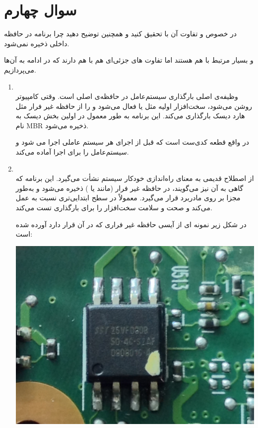 \section{سوال چهارم}

در خصوص  و تفاوت آن با  تحقیق کنید و همچنین توضیح دهید چرا برنامه  در حافظه داخلی ذخیره نمی‌شود.


\begin{qsolve}[]
	و
	بسیار مرتبط با هم هستند اما تفاوت های جزئی‌ای هم با هم دارند که در ادامه به آن‌ها می‌پردازیم.
	
	\begin{enumerate}
		\item 
		\\
		وظیفه‌ی اصلی  بارگذاری سیستم‌عامل در حافظه‌ی اصلی است. وقتی کامپیوتر روشن می‌شود، سخت‌افزار اولیه مثل  یا  فعال می‌شود و  را از حافظه غیر فرار مثل هارد دیسک بارگذاری می‌کند. این برنامه به طور معمول در اولین بخش دیسک به نام MBR ذخیره می‌شود.
		
		 در واقع  قطعه کدی‌ست است که قبل از اجرای هر سیستم عاملی اجرا می شود و سیستم‌عامل را برای اجرا آماده می‌کند.
		 
		 
		 \item 
		 \\
		 از اصطلاح قدیمی  به معنای راه‌اندازی خودکار سیستم نشأت می‌گیرد. این برنامه که گاهی به آن  نیز می‌گویند، در حافظه غیر فرار (مانند  یا ) ذخیره می‌شود و به‌طور مجزا بر روی مادربرد قرار می‌گیرد.  معمولاً در سطح ابتدایی‌تری نسبت به  عمل می‌کند و صحت و سلامت سخت‌افزار را برای بارگذاری  تست می‌کند.
		 
		 در شکل زیر نمونه ای از آیسی حافظه غیر فراری که  در آن قرار دارد آورده شده است:
		 
		 
		 \begin{center}
		 	\includegraphics*[width=0.8\linewidth]{pics/img3.png}
		 \end{center}
		 
	\end{enumerate}
	
\end{qsolve}